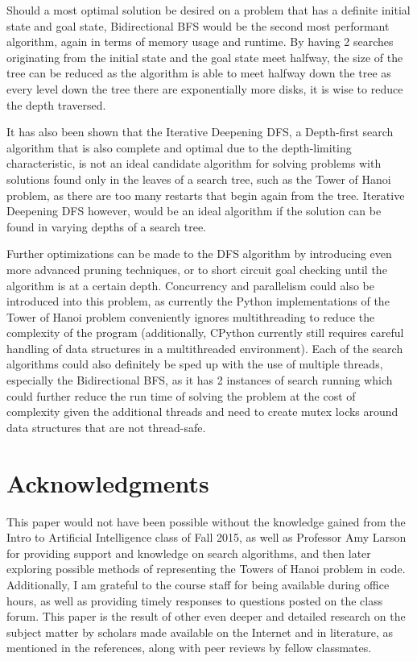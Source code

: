 \documentclass[conference]{IEEEtran}
\begin{document}
Should a most optimal solution be desired on a problem that has a definite initial state and goal state, Bidirectional BFS would be the second most performant algorithm, again in terms of memory usage and runtime. By having 2 searches originating from the initial state and the goal state meet halfway, the size of the tree can be reduced as the algorithm is able to meet halfway down the tree as every level down the tree there are exponentially more disks, it is wise to reduce the depth traversed.

It has also been shown that the Iterative Deepening DFS, a Depth-first search algorithm that is also complete and optimal due to the depth-limiting characteristic, is not an ideal candidate algorithm for solving problems with solutions found only in the leaves of a search tree, such as the Tower of Hanoi problem, as there are too many restarts that begin again from the tree. Iterative Deepening DFS however, would be an ideal algorithm if the solution can be found in varying depths of a search tree. 

Further optimizations can be made to the DFS algorithm by introducing even more advanced pruning techniques, or to short circuit goal checking until the algorithm is at a certain depth. Concurrency and parallelism could also be introduced into this problem, as currently the Python implementations of the Tower of Hanoi problem conveniently ignores multithreading to reduce the complexity of the program (additionally, CPython currently still requires careful handling of data structures in a multithreaded environment). Each of the search algorithms could also definitely be sped up with the use of multiple threads, especially the Bidirectional BFS, as it has 2 instances of search running which could further reduce the run time of solving the problem at the cost of complexity given the additional threads and need to create mutex locks around data structures that are not thread-safe.

\section{Acknowledgments}

This paper would not have been possible without the knowledge gained from the Intro to Artificial Intelligence class of Fall 2015, as well as Professor Amy Larson for providing support and knowledge on search algorithms, and then later exploring possible methods of representing the Towers of Hanoi problem in code. Additionally, I am grateful to the course staff for being available during office hours, as well as providing timely responses to questions posted on the class forum. This paper is the result of other even deeper and detailed research on the subject matter by scholars made available on the Internet and in literature, as mentioned in the references, along with peer reviews by fellow classmates.
\end{document}
